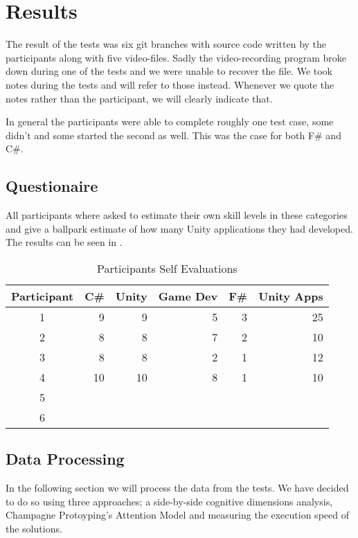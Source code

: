 \section{Results}
The result of the tests was six git branches with source code written by the participants along with five video-files. Sadly the video-recording program broke down during one of the tests and we were unable to recover the file. We took notes during the tests and will refer to those instead. Whenever we quote the notes rather than the participant, we will clearly indicate that.

In general the participants were able to complete roughly one test case, some didn't and some started the second as well. This was the case for both F\# and C\#.

\subsection{Questionaire}
All participants where asked to estimate their own skill levels in these categories and give a ballpark estimate of how many Unity applications they had developed. The results can be seen in .

\begin{table}[H]
\begin{tabular}{| c | r | r | r | r | r |}
	\hline
	\textbf{Participant}&\textbf{C\#}&\textbf{Unity}&\textbf{Game Dev}&\textbf{F\#}&\textbf{Unity Apps} \\ \hline
	1 & 9 & 9 & 5 & 3 & 25 \\ \hline
	2 & 8 & 8 & 7 & 2 & 10 \\ \hline
	3 & 8 & 8 & 2 & 1 & 12 \\ \hline
	4 & 10 & 10 & 8 & 1 & 10 \\ \hline
	5 & & & & & \\ \hline
	6 & & & & & \\ \hline
\end{tabular}
\caption{Participants Self Evaluations}
\label{tab:participant-scores}
\end{table}

\subsection{Data Processing}
In the following section we will process the data from the tests. We have decided to do so using three approaches; a side-by-side cognitive dimensions analysis, Champagne Protoyping's Attention Model and measuring the execution speed of the solutions.

